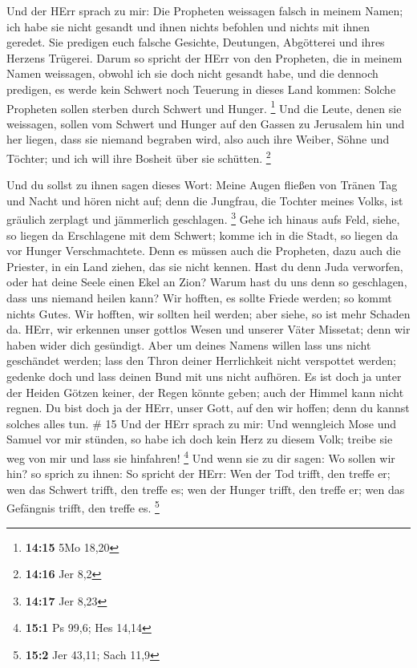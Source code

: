  Und der HErr sprach zu mir: Die Propheten weissagen falsch
in meinem Namen; ich habe sie nicht gesandt und ihnen nichts befohlen
und nichts mit ihnen geredet. Sie predigen euch falsche Gesichte,
Deutungen, Abgötterei und ihres Herzens Trügerei.  Darum so
spricht der HErr von den Propheten, die in meinem Namen weissagen,
obwohl ich sie doch nicht gesandt habe, und die dennoch predigen, es
werde kein Schwert noch Teuerung in dieses Land kommen: Solche Propheten
sollen sterben durch Schwert und Hunger. \footnote{\textbf{14:15} 5Mo
  18,20}  Und die Leute, denen sie weissagen, sollen vom
Schwert und Hunger auf den Gassen zu Jerusalem hin und her liegen, dass
sie niemand begraben wird, also auch ihre Weiber, Söhne und Töchter; und
ich will ihre Bosheit über sie schütten. \footnote{\textbf{14:16} Jer
  8,2}

 Und du sollst zu ihnen sagen dieses Wort: Meine Augen
fließen von Tränen Tag und Nacht und hören nicht auf; denn die Jungfrau,
die Tochter meines Volks, ist gräulich zerplagt und jämmerlich
geschlagen. \footnote{\textbf{14:17} Jer 8,23}  Gehe ich
hinaus aufs Feld, siehe, so liegen da Erschlagene mit dem Schwert; komme
ich in die Stadt, so liegen da vor Hunger Verschmachtete. Denn es müssen
auch die Propheten, dazu auch die Priester, in ein Land ziehen, das sie
nicht kennen.  Hast du denn Juda verworfen, oder hat deine
Seele einen Ekel an Zion? Warum hast du uns denn so geschlagen, dass uns
niemand heilen kann? Wir hofften, es sollte Friede werden; so kommt
nichts Gutes. Wir hofften, wir sollten heil werden; aber siehe, so ist
mehr Schaden da.  HErr, wir erkennen unser gottlos Wesen
und unserer Väter Missetat; denn wir haben wider dich gesündigt.
 Aber um deines Namens willen lass uns nicht geschändet
werden; lass den Thron deiner Herrlichkeit nicht verspottet werden;
gedenke doch und lass deinen Bund mit uns nicht aufhören. 
Es ist doch ja unter der Heiden Götzen keiner, der Regen könnte geben;
auch der Himmel kann nicht regnen. Du bist doch ja der HErr, unser Gott,
auf den wir hoffen; denn du kannst solches alles tun. \# 15 
Und der HErr sprach zu mir: Und wenngleich Mose und Samuel vor mir
stünden, so habe ich doch kein Herz zu diesem Volk; treibe sie weg von
mir und lass sie hinfahren! \footnote{\textbf{15:1} Ps 99,6; Hes 14,14}
 Und wenn sie zu dir sagen: Wo sollen wir hin? so sprich zu
ihnen: So spricht der HErr: Wen der Tod trifft, den treffe er; wen das
Schwert trifft, den treffe es; wen der Hunger trifft, den treffe er; wen
das Gefängnis trifft, den treffe es. \footnote{\textbf{15:2} Jer 43,11;
  Sach 11,9}

